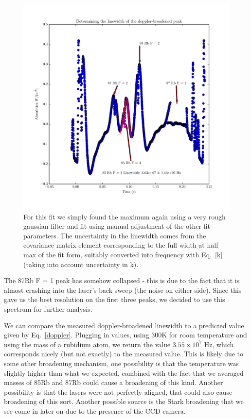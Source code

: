 \documentclass{article}
\begin{document}
  \begin{figure}[!htb]
    \centering
    \includegraphics[scale=.75]{../plots/rb85_fwhm.pdf}
    \caption{For this fit we simply found the maximum again using a very rough gaussian filter and fit using manual adjustment of the other fit parameters.  The uncertainty in the linewidth comes from the covariance matrix element corresponding to the full width at half max of the fit form, suitably converted into frequency with Eq.~\ref{k} (taking into account uncertainty in k).}
    \label{full_spectrum}
  \end{figure}

  \hspace{.25cm}

  The 87Rb F = 1 peak has somehow collapsed - this is due to the fact that it is almost crashing into the laser's back sweep (the noise on either side).  Since this gave us the best resolution on the first three peaks, we decided to use this spectrum for further analysis.

  \hspace{.25cm}

  We can compare the measured doppler-broadened linewidth to a predicted value given by Eq.~\ref{doppler}.  Plugging in values, using 300K for room temperature and using the mass of a rubidium atom, we return the value $3.55 \times 10^7$ Hz, which corresponds nicely (but not exactly) to the measured value.  This is likely due to some other broadening mechanism, one possibility is that the temperature was slightly higher than what we expected, combined with the fact that we averaged masses of 85Rb and 87Rb could cause a broadening of this kind.  Another possibility is that the lasers were not perfectly aligned, that could also cause broadening of this sort.  Another possible source is the Stark broadening that we see come in later on due to the presence of the CCD camera.
\end{document}
